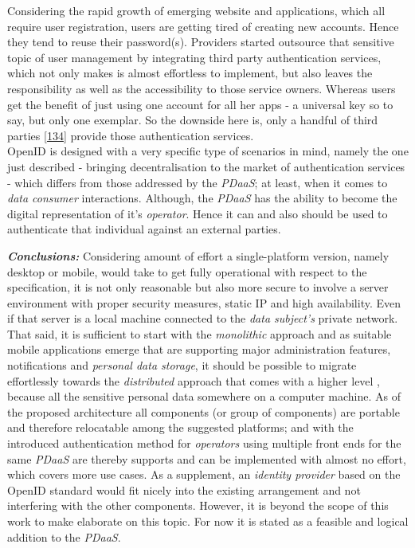 \documentclass[12pt,english,a4paper,titlepage,cleardoublepage=empty,dottedtoc]{report}
\begin{document}
Considering the rapid growth of emerging website and applications, which
all require user registration, users are getting tired of creating new
accounts. Hence they tend to reuse their password(s). Providers started
outsource that sensitive topic of user management by integrating third
party authentication services, which not only makes is almost effortless
to implement, but also leaves the responsibility as well as the
accessibility to those service owners. Whereas users get the benefit of
just using one account for all her apps - a universal key so to say, but
only one exemplar. So the downside here is, only a handful of third
parties
{[}\protect\hyperlink{ref-web_2009-success-of-facebook-connect}{134}{]}
provide those authentication services.\\
OpenID is designed with a very specific type of scenarios in mind,
namely the one just described - bringing decentralisation to the market
of authentication services - which differs from those addressed by the
\emph{PDaaS}; at least, when it comes to \emph{data consumer}
interactions. Although, the \emph{PDaaS} has the ability to become the
digital representation of it's \emph{operator}. Hence it can and also
should be used to authenticate that individual against an external
parties.

\emph{\textbf{Conclusions:}} Considering amount of effort a
single-platform version, namely desktop or mobile, would take to get
fully operational with respect to the specification, it is not only
reasonable but also more secure to involve a server environment with
proper security measures, static IP and high availability. Even if that
server is a local machine connected to the \emph{data subject's} private
network. That said, it is sufficient to start with the \emph{monolithic}
approach and as suitable mobile applications emerge that are supporting
major administration features, notifications and \emph{personal data
storage}, it should be possible to migrate effortlessly towards the
\emph{distributed} approach that comes with a higher level , because all
the sensitive personal data somewhere on a computer machine. As of the
proposed architecture all components (or group of components) are
portable and therefore relocatable among the suggested platforms; and
with the introduced authentication method for \emph{operators} using
multiple front ends for the same \emph{PDaaS} are thereby supports and
can be implemented with almost no effort, which covers more use cases.
As a supplement, an \emph{identity provider} based on the OpenID
standard would fit nicely into the existing arrangement and not
interfering with the other components. However, it is beyond the scope
of this work to make elaborate on this topic. For now it is stated as a
feasible and logical addition to the \emph{PDaaS}.
\end{document}
